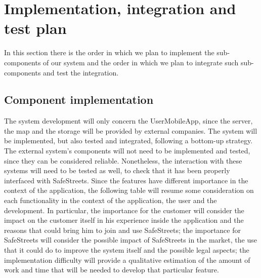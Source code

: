 \documentclass[../RASD.tex]{subfiles}
\begin{document}
    \chapter{Implementation, integration and test plan}\label{ch:implementation,-integration-and-test-plan}
    In this section there is the order in which we plan to implement the sub-components of our system
    and the order in which we plan to integrate such sub-components and test the integration.
    \section{Component implementation}\label{sec:component-implementation}
    The system development will only concern the UserMobileApp, since the server, the map and the storage will be provided by external companies.
    The system will be implemented, but also tested and integrated, following a bottom-up strategy.
    The external system’s components will not need to be implemented and tested, since they can be considered reliable.
    Nonetheless, the interaction with these systems will need to be tested as well, to check that it has been properly interfaced with SafeStreets.
    Since the features have different importance in the context of the application, the following table will resume some consideration on each functionality
    in the context of the application, the user and the development.
    In particular, the importance for the customer will consider the impact on the customer itself in his experience inside the application and the reasons
    that could bring him to join and use SafeStreets;
    the importance for SafeStreets will consider the possible impact of SafeStreets in the market, the use that it could do to improve the system itself
    and the possible legal aspects;
    the implementation difficulty will provide a qualitative estimation of the amount of work and time that will be needed to develop that particular feature.
    \newpage
\end{document}
